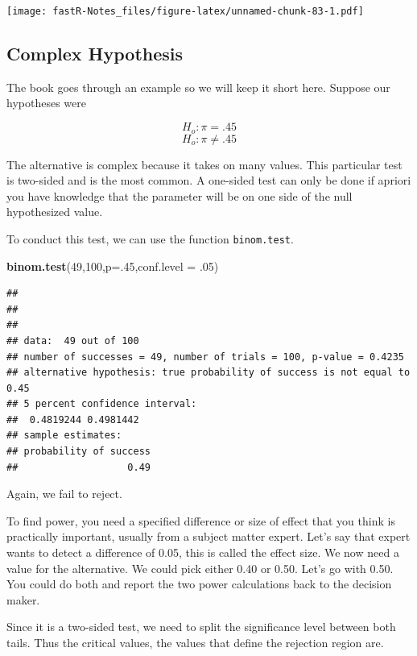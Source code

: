 \documentclass[]{book}
\newenvironment{Shaded}{\begin{snugshade}}{\end{snugshade}}
\newcommand{\KeywordTok}[1]{\textcolor[rgb]{0.13,0.29,0.53}{\textbf{#1}}}
\newcommand{\DataTypeTok}[1]{\textcolor[rgb]{0.13,0.29,0.53}{#1}}
\newcommand{\DecValTok}[1]{\textcolor[rgb]{0.00,0.00,0.81}{#1}}
\newcommand{\NormalTok}[1]{#1}
\theoremstyle{definition}
\theoremstyle{definition}
\theoremstyle{definition}
\theoremstyle{remark}
\begin{document}
\texttt{[image: fastR-Notes\_files/figure-latex/unnamed-chunk-83-1.pdf]}

\subsection{Complex Hypothesis}\label{complex-hypothesis}

The book goes through an example so we will keep it short here. Suppose
our hypotheses were

\[H_{o}:\pi=.45\] \[H_{o}:\pi\neq.45\]

The alternative is complex because it takes on many values. This
particular test is two-sided and is the most common. A one-sided test
can only be done if apriori you have knowledge that the parameter will
be on one side of the null hypothesized value.

To conduct this test, we can use the function \texttt{binom.test}.

\begin{Shaded}
\begin{Highlighting}[]
\KeywordTok{binom.test}\NormalTok{(}\DecValTok{49}\NormalTok{,}\DecValTok{100}\NormalTok{,}\DataTypeTok{p=}\NormalTok{.}\DecValTok{45}\NormalTok{,}\DataTypeTok{conf.level =}\NormalTok{ .}\DecValTok{05}\NormalTok{)}
\end{Highlighting}
\end{Shaded}

\begin{verbatim}
## 
## 
## 
## data:  49 out of 100
## number of successes = 49, number of trials = 100, p-value = 0.4235
## alternative hypothesis: true probability of success is not equal to 0.45
## 5 percent confidence interval:
##  0.4819244 0.4981442
## sample estimates:
## probability of success 
##                   0.49
\end{verbatim}

Again, we fail to reject.

To find power, you need a specified difference or size of effect that
you think is practically important, usually from a subject matter
expert. Let's say that expert wants to detect a difference of 0.05, this
is called the effect size. We now need a value for the alternative. We
could pick either 0.40 or 0.50. Let's go with 0.50. You could do both
and report the two power calculations back to the decision maker.

Since it is a two-sided test, we need to split the significance level
between both tails. Thus the critical values, the values that define the
rejection region are.
\end{document}
